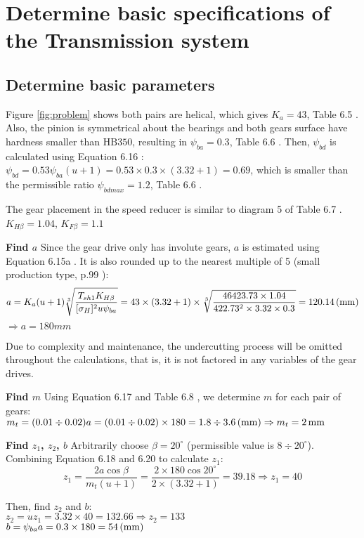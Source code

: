 \section{Determine basic specifications of the Transmission system}

\subsection{Determine basic parameters}
Figure \ref{fig:problem} shows both pairs are helical, which  gives $ K_a = 43 $, Table 6.5 \cite{tk1}. Also, the pinion is symmetrical about the bearings and both gears surface have hardness smaller than $ \text{HB}350 $, resulting in $ \psi_{ba} = 0.3$, Table 6.6 \cite{tk1}. Then, $ \psi_{bd} $ is calculated using Equation 6.16 \cite{tk1}:\\
$ \psi_{bd} = 0.53\psi_{ba}(u+1) = 0.53\times 0.3\times(3.32+1) = 0.69 $, which is smaller than the permissible ratio $ \psi_{bdmax}=1.2 $, Table 6.6 \cite{tk1}.

The gear placement in the speed reducer is similar to diagram 5 of Table 6.7 \cite{tk1}. $ K_{H\beta} = 1.04 $, $ K_{F\beta} = 1.1 $

\textbf{Find $ a $} Since the gear drive only has involute gears, $ a $ is estimated using Equation 6.15a \cite{tk1}. It is also rounded up to the nearest multiple of 5 (small production type, p.99 \cite{tk1}):
\[a= K_a(u+1)\sqrt[3]{\dfrac{T_{sh1}K_{H\beta}}{[\sigma_H]^2u\psi_{ba}}}	=  43\times(3.32+1)\times\sqrt[3]{\dfrac{46423.73\times 1.04}{422.73^2\times 3.32\times 0.3}}
= 120.14 \, (\mathrm{mm})\]
$ \Rightarrow a= 180 \unit{mm} $

Due to complexity and maintenance, the undercutting process will be omitted throughout the calculations, that is, it is not factored in any variables of the gear drives.

\textbf{Find $ m $} Using Equation 6.17 \cite{tk1} and Table 6.8 \cite{tk1}, we determine $ m $ for each pair of gears:\\
$ m_t = (0.01\div0.02)a = (0.01\div0.02)\times 180 =  1.8 \div 3.6 \, (\mathrm{mm}) \Rightarrow m_t=2\, \mathrm{mm}$

\textbf{Find $ z_1 $, $ z_2 $, $ b $} Arbitrarily choose $ \beta = 20^\circ $ (permissible value is $ 8 \div 20^\circ $). Combining Equation 6.18 and 6.20 \cite{tk1} to calculate $ z_1 $:
\[z_1 = \dfrac{2a\cos\beta}{m_t(u+1)}= \dfrac{2\times 180\cos 20^\circ}{2\times(3.32+1)} = 39.18 \Rightarrow z_1 = 40\]

Then, find $ z_2 $ and $ b $:\\
$ z_2 = uz_1 = 3.32\times 40 = 132.66 \Rightarrow z_2 = 133 $\\
$ b = \psi_{ba}a = 0.3\times 180= 54\, (\mathrm{mm})$

